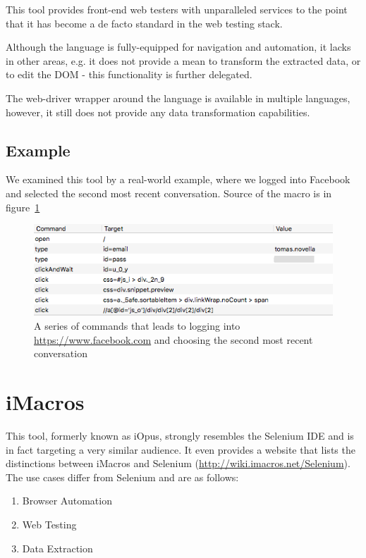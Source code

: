 This tool provides front-end web testers with unparalleled services to the point that it has become a de facto standard in the web testing stack.

Although the language is fully-equipped for navigation and automation, it lacks in other areas, e.g. it does not provide a mean to transform the extracted data, or to edit the DOM - this functionality is further delegated.

The web-driver wrapper around the language is available in multiple languages, however, it  still does not provide any data transformation capabilities.

\subsection{Example}
We examined this tool by a real-world example, where we logged into Facebook and selected the second most recent conversation.
Source of the macro is in figure~\ref{fig:seleniumCommands}
\begin{figure}
    \centering
    \includegraphics[width=\textwidth]{../img/seleniumCommands}
    \caption{A series of commands that leads to logging into \url{https://www.facebook.com} and choosing the second most recent conversation}
    \label{fig:seleniumCommands}
\end{figure}

\section{iMacros}
This tool, formerly known as iOpus, strongly resembles the Selenium IDE and is in fact targeting a very similar audience. It even provides a website that lists the distinctions between iMacros and Selenium (\url{http://wiki.imacros.net/Selenium}). The use cases differ from Selenium and are as follows:
\begin{enumerate}
    \item Browser Automation
    \item Web Testing
    \item Data Extraction
\end{enumerate}

